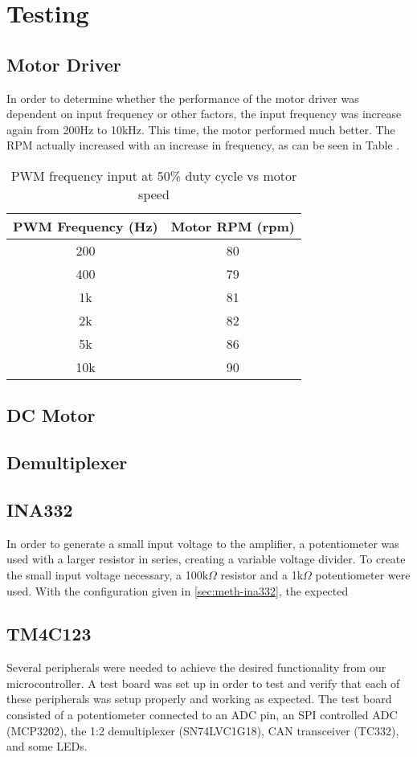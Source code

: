 \section{Testing}
\subsection{Motor Driver}
In order to determine whether the performance of the motor driver was dependent on input frequency or other factors, the input frequency was increase again from 200Hz to 10kHz. This time, the motor performed much better. The RPM actually increased with an increase in frequency, as can be seen in Table .
\begin{table}[H]
	\centering
	\caption{PWM frequency input at 50\% duty cycle vs motor speed}
	\begin{tabular}{| c | c |}
		\hline
		PWM Frequency (Hz) & Motor RPM (rpm) \\
		\hline
		200 & 80 \\
		400 & 79 \\
		1k & 81 \\
		2k & 82 \\
		5k & 86 \\
		10k & 90 \\
		\hline
	\end{tabular}
	\label{tbl:freq-test}
\end{table}

\subsection{DC Motor}


\subsection{Demultiplexer}

\subsection{INA332}
In order to generate a small input voltage to the amplifier, a potentiometer was used with a larger resistor in series, creating a variable voltage divider. To create the small input voltage necessary, a 100k$\Omega$ resistor and a 1k$\Omega$ potentiometer were used. With the configuration given in \ref{sec:meth-ina332}, the expected 

\subsection{TM4C123}
Several peripherals were needed to achieve the desired functionality from our microcontroller. A test board was set up in order to test and verify that each of these peripherals was setup properly and working as expected. The test board consisted of a potentiometer connected to an ADC pin, an SPI controlled ADC (MCP3202), the 1:2 demultiplexer (SN74LVC1G18), CAN transceiver (TC332), and some LEDs.

